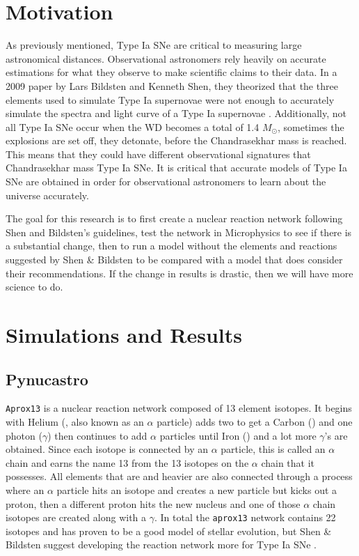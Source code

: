 \documentclass[preprint]{aastex62}
\begin{document}
\section{Motivation}
  
  As previously mentioned, Type Ia SNe are critical to measuring large astronomical distances. Observational astronomers rely heavily on accurate estimations for what they observe to make scientific claims to their data. In a 2009 paper by Lars Bildsten and Kenneth Shen, they theorized that the three elements used to simulate Type Ia supernovae were not enough to accurately simulate the spectra and light curve of a Type Ia supernovae \citep{shenNbildsten}. Additionally, not all Type Ia SNe occur when the WD becomes a total of 1.4 $M_{\odot}$, sometimes the explosions are set off, they detonate, before the Chandrasekhar mass is reached. This means that they could have different observational signatures that Chandrasekhar mass Type Ia SNe. It is critical that accurate models of Type Ia SNe are obtained in order for observational astronomers to learn about the universe accurately. 
  
  The goal for this research is to first create a nuclear reaction network following Shen and Bildsten's guidelines, test the network in Microphysics to see if there is a substantial change, then to run a model without the elements and reactions suggested by Shen \& Bildsten to be compared with a model that does consider their recommendations. If the change in results is drastic, then we will have more science to do. 
  
\section{Simulations and Results}
  
  \subsection{Pynucastro}
    
    {\tt Aprox13} is a nuclear reaction network composed of 13 element isotopes. It begins with Helium (, also known as an $\alpha$ particle) adds two  to get a Carbon () and one photon ($\gamma$) then continues to add $\alpha$ particles until Iron () and a lot more $\gamma$'s are obtained. Since each isotope is connected by an $\alpha$ particle, this is called an $\alpha$ chain and earns the name 13 from the 13 isotopes on the $\alpha$ chain that it possesses. All elements that are  and heavier are also connected through a process where an $\alpha$ particle hits an isotope and creates a new particle but kicks out a proton, then a different proton hits the new nucleus and one of those $\alpha$ chain isotopes are created along with a $\gamma$. In total the {\tt aprox13} network contains 22 isotopes and has proven to be a good model of stellar evolution, but Shen \& Bildsten suggest developing the reaction network more for Type Ia SNe \citep{timmes}.
    
\end{document}
